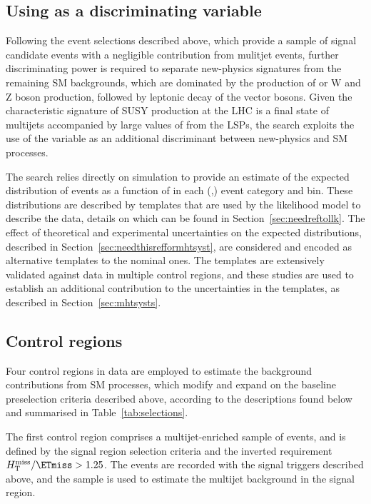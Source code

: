 \subsection{Using \HTmiss as a discriminating variable}

Following the event selections described above, which provide a sample
of signal candidate events with a negligible contribution from
mulitjet events, further discriminating power is required to separate
new-physics signatures from the remaining SM backgrounds, which are
dominated by the production of \ttbar or W and Z boson production,
followed by leptonic decay of the vector bosons. Given the
characteristic signature of SUSY production at the LHC is a final
state of multijets accompanied by large values of \ptvecmiss from the
LSPs, the search exploits the use of the \HTmiss variable as an
additional discriminant between new-physics and SM processes.

The search relies directly on simulation to provide an estimate of the
expected distribution of events as a function of \HTmiss in each
(\njet,\nb) event category and \scalht bin. These distributions are
described by templates that are used by the likelihood model to
describe the data, details on which can be found in
Section~\ref{sec:needreftollk}. The effect of theoretical and
experimental uncertainties on the expected \HTmiss distributions,
described in Section~\ref{sec:needthisrefformhtsyst}, are considered
and encoded as alternative templates to the nominal ones. The
templates are extensively validated against data in multiple control
regions, and these studies are used to establish an additional
contribution to the uncertainties in the templates, as described in
Section~\ref{sec:mhtsysts}.

\subsection{Control regions}
\label{sec:control_regions}

Four control regions in data are employed to estimate the background
contributions from SM processes, which modify and expand on the
baseline preselection criteria described above, according to the
descriptions found below and summarised in Table~\ref{tab:selections}.

The first control region comprises a multijet-enriched sample of
events, and is defined by the signal region selection criteria and the
inverted requirement $\HTmiss / \ETmiss > 1.25$. The events are
recorded with the signal triggers described above, and the sample is
used to estimate the multijet background in the signal region.
 

